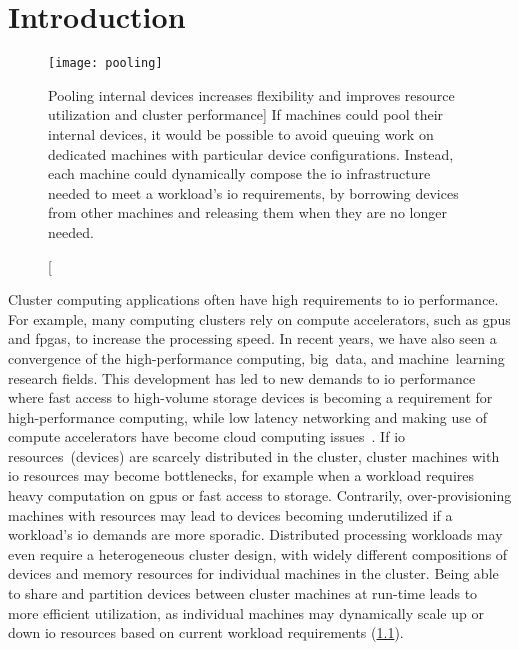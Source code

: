 \chapter{Introduction}\label{chapter:intro}

\begin{figure}
	\centering
	\texttt{[image: pooling]}
    \caption
    [Pooling internal devices increases flexibility and improves resource utilization and cluster performance]
    {If machines could pool their internal devices, it would be possible to avoid queuing work on dedicated machines with particular device configurations. Instead, each machine could dynamically compose the \gls{io} infrastructure needed to meet a workload's \gls{io} requirements, by borrowing devices from other machines and releasing them when they are no longer needed.}
    \label{fig:device-pool}
\end{figure}

Cluster computing applications often have high requirements to \gls{io} performance.
%
For example, many computing clusters rely on compute accelerators, such as \glspl{gpu} and \glspl{fpga}, to increase the processing speed.
%
In recent years, we have also seen a convergence of the high-performance computing, big~data, and machine~learning research fields.
%
This development has led to new demands to \gls{io} performance where fast access to high-volume storage devices is becoming a requirement for high-performance computing, while low latency networking and making use of compute accelerators have become cloud computing issues~\cite{Trivedi2011,Coates2013,Taherkordi2018}.
%
If \gls{io} resources~(devices) are scarcely distributed in the cluster, cluster machines with \gls{io} resources may become bottlenecks, for example when a workload requires heavy computation on \glspl{gpu} or fast access to storage.
%
Contrarily, over-provisioning machines with resources may lead to devices becoming underutilized if a workload's \gls{io} demands are more sporadic.
%
Distributed processing workloads may even require a heterogeneous cluster design, with widely different compositions of devices and memory resources for individual machines in the cluster.
%
Being able to share and partition devices between cluster machines at run-time leads to more efficient utilization, as individual machines may dynamically scale up or down \gls{io} resources based on current workload requirements (\cref{fig:device-pool}).



